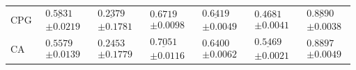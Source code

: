 \documentclass{article}
\begin{document}
\begin{table}[!htbp]
\begin{tabular*}{\textwidth}{@{\extracolsep{\fill}}lcccccc@{}}
        CPG & $\begin{gathered}\underline{0.5831}\\[-2pt]\pm 0.0219\end{gathered}$ & $\begin{gathered}\underline{0.2379}\\[-2pt]\pm 0.1781\end{gathered}$ & $\begin{gathered}\mathbf{0.6719}\\[-2pt]\pm 0.0098\end{gathered}$ & $\begin{gathered}\underline{0.6419}\\[-2pt]\pm 0.0049\end{gathered}$ & $\begin{gathered}\mathbf{0.4681}\\[-2pt]\pm 0.0041\end{gathered}$ & $\begin{gathered}\underline{0.8890}\\[-2pt]\pm 0.0038\end{gathered}$ \\
        \addlinespace[3pt]
        CA & $\begin{gathered}\mathbf{0.5579}\\[-2pt]\pm 0.0139\end{gathered}$ & $\begin{gathered}0.2453\\[-2pt]\pm 0.1779\end{gathered}$ & $\begin{gathered}\underline{0.7051}\\[-2pt]\pm 0.0116\end{gathered}$ & $\begin{gathered}\mathbf{0.6400}\\[-2pt]\pm 0.0062\end{gathered}$ & $\begin{gathered}\underline{0.5469}\\[-2pt]\pm 0.0021\end{gathered}$ & $\begin{gathered}0.8897\\[-2pt]\pm 0.0049\end{gathered}$ \\
        \bottomrule
    \end{tabular*}
\end{table}
\end{document}
